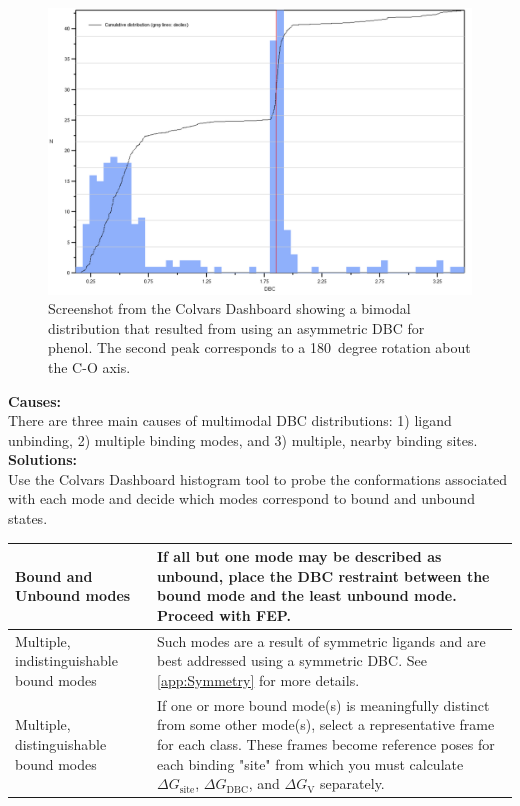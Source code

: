 \documentclass[9pt,tutorial]{Styling/livecoms}
\begin{document}
\begin{figure}[!ht]
    \centering
    \includegraphics[width=0.9\linewidth]{bimodal_distribution.png}
    \caption{Screenshot from the Colvars Dashboard showing a bimodal distribution that resulted from using an asymmetric DBC for phenol. The second peak corresponds to a 180~degree rotation about the C-O axis.}
    \label{fig:bimodalDBC}
\end{figure}
\textbf{Causes:}\\
There are three main causes of multimodal DBC distributions: 1) ligand unbinding, 2) multiple binding modes, and 3) multiple, nearby binding sites.\\ 
\textbf{Solutions:}\\
Use the Colvars Dashboard histogram tool to probe the conformations associated with each mode and decide which modes correspond to bound and unbound states. \\
\begin{tabular}{|p{3cm}|p{5cm}|}
    \hline
    \center Bound and Unbound modes & If all but one mode may be described as unbound, place the DBC restraint between the bound mode and the least unbound mode. Proceed with FEP. \\\hline
    \center Multiple, indistinguishable bound modes & Such modes are a result of symmetric ligands and are best addressed using a symmetric DBC. See \ref{app:Symmetry} for more details.\\\hline
    \center Multiple, distinguishable bound modes & If one or more bound mode(s) is meaningfully distinct from some other mode(s), select a representative frame for each class. These frames become reference poses for each binding "site" from which you must calculate $\Delta G_\mathrm{site}$, $\Delta G_\mathrm{DBC}$, and $\Delta G_\mathrm{V}$ separately. \\\hline
\end{tabular}
\end{document}
